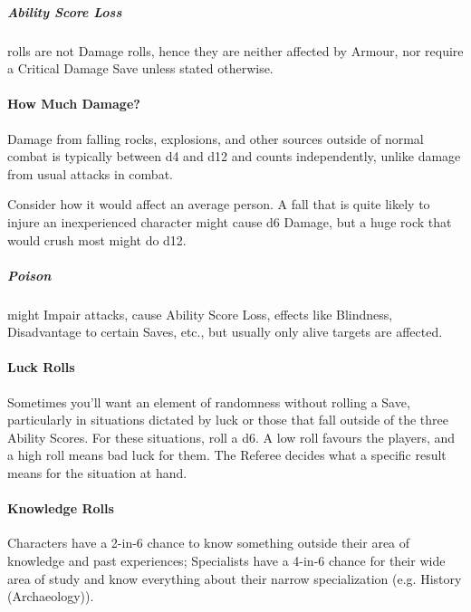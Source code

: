 \documentclass[itdr]{subfiles}
\begin{document}
\subparagraph{Ability Score Loss} rolls are not Damage rolls, hence they are neither affected by Armour, nor require a Critical Damage Save unless stated otherwise.

\vfill

\paragraph{How Much Damage?}
Damage from falling rocks, explosions, and other sources outside of normal combat is typically between d4 and d12 and counts independently, unlike damage from usual attacks in combat.

Consider how it would affect an average person. A fall that is quite likely to injure an inexperienced character might cause d6 Damage, but a huge rock that would crush most might do d12.

\subparagraph{Poison} might Impair attacks, cause Ability Score Loss, effects like Blindness, Disadvantage to certain Saves, etc., but usually only alive targets are affected.

\vfill

\paragraph{Luck Rolls}
Sometimes you'll want an element of randomness without rolling a Save, particularly in situations dictated by luck or those that fall outside of the three Ability Scores. For these situations, roll a d6. A low roll favours the players, and a high roll means bad luck for them. The Referee decides what a specific result means for the situation at hand.

\vfill

\paragraph{Knowledge Rolls}
Characters have a 2-in-6 chance to know something outside their area of knowledge and past experiences; Specialists have a 4-in-6 chance for their wide area of study and know everything about their narrow specialization (e.g. History (Archaeology)).

\vfill
\end{document}
